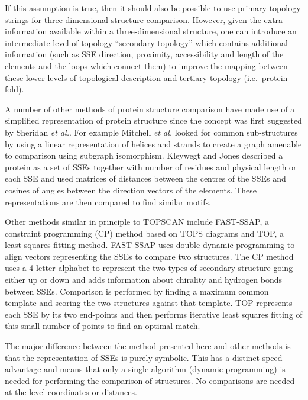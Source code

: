 \documentclass{article}
\begin{document}
If this assumption is true, then it should also be possible to use
primary topology strings for three-dimensional structure comparison.
However, given the extra information available within a
three-dimensional structure, one can introduce an intermediate level
of topology ``secondary topology'' which contains additional
information (such as SSE direction, proximity, accessibility and
length of the elements and the loops which connect them) to improve
the mapping between these lower levels of topological description and
tertiary topology (i.e.\ protein fold).

A number of other methods of protein structure comparison have made
use of a simplified representation of protein structure since the
concept was first suggested by Sheridan \emph{et
al.}.  For example Mitchell \emph{et
al.} looked for common sub-structures by
using a linear representation of helices and strands to create a graph
amenable to comparison using subgraph isomorphism.  Kleywegt and
Jones described a protein as a set of SSEs
together with number of residues and physical length or each SSE and
used matrices of distances between the centres of the SSEs and cosines
of angles between the direction vectors of the elements. These
representations are then compared to find similar motifs.

Other methods similar in principle to TOPSCAN include
FAST-SSAP\cite{taylor:alignment}, a constraint programming (CP) method
based on TOPS diagrams\cite{David_Gilbert_David_Westhead} and TOP, a
least-squares fitting method\cite{lu:top}.  FAST-SSAP uses double
dynamic programming to align vectors representing the SSEs to compare
two structures. The CP method uses a 4-letter alphabet to represent
the two types of secondary structure going either up or down and adds
information about chirality and hydrogen bonds between SSEs.
Comparison is performed by finding a maximum common template and
scoring the two structures against that template.  TOP represents each
SSE by its two end-points and then performs iterative least squares
fitting of this small number of points to find an optimal match.

The major difference between the method presented here and other
methods is that the representation of SSEs is purely symbolic. This
has a distinct speed advantage and means that only a single algorithm
(dynamic programming) is needed for performing the comparison of
structures. No comparisons are needed at the level coordinates or
distances.
\end{document}
